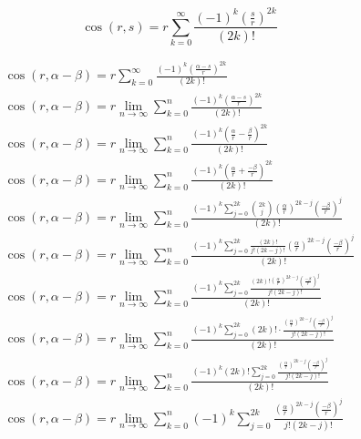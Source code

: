 \documentclass[a4paper,12pt]{report}
\begin{document}
\begin{equation}
\cos(r,s) = r \sum \limits_{k=0}^{\infty} \frac{(-1)^k \left(\frac{s}{r}\right)^{2k}}{(2k)!}
\end{equation}
\begin{landscape}
{
\allowdisplaybreaks
\begin{gather}
\cos(r,\alpha - \beta) = r \sum \limits_{k=0}^{\infty} \frac{(-1)^k \left(\frac{\alpha - s}{r}\right)^{2k}}{(2k)!} \\
\cos(r,\alpha - \beta) = r \lim \limits_{n \to \infty} \sum \limits_{k=0}^{n} \frac{(-1)^k \left(\frac{\alpha - s}{r}\right)^{2k}}{(2k)!} \\
\cos(r,\alpha - \beta) = r \lim \limits_{n \to \infty} \sum \limits_{k=0}^{n} \frac{(-1)^k \left(\frac{\alpha}{r} - \frac{\beta}{r}\right)^{2k}}{(2k)!} \\
\cos(r,\alpha - \beta) = r \lim \limits_{n \to \infty} \sum \limits_{k=0}^{n} \frac{(-1)^k \left(\frac{\alpha}{r} + \frac{-\beta}{r}\right)^{2k}}{(2k)!} \\
\cos(r,\alpha - \beta) = r \lim \limits_{n \to \infty} \sum \limits_{k=0}^{n} \frac{(-1)^k \sum \limits_{j=0}^{2k} \binom{2k}{j} \left(\frac{\alpha}{r}\right)^{2k-j} \left(\frac{-\beta}{r}\right)^j}{(2k)!} \\
\cos(r,\alpha - \beta) = r \lim \limits_{n \to \infty} \sum \limits_{k=0}^{n} \frac{(-1)^k \sum \limits_{j=0}^{2k} \frac{(2k)!}{j! (2k-j)!} \left(\frac{\alpha}{r}\right)^{2k-j} \left(\frac{-\beta}{r}\right)^j}{(2k)!} \\
\cos(r,\alpha - \beta) = r \lim \limits_{n \to \infty} \sum \limits_{k=0}^{n} \frac{(-1)^k \sum \limits_{j=0}^{2k} \frac{(2k)! \left(\frac{\alpha}{r}\right)^{2k-j} \left(\frac{-\beta}{r}\right)^j}{j! (2k-j)!}}{(2k)!} \\
\cos(r,\alpha - \beta) = r \lim \limits_{n \to \infty} \sum \limits_{k=0}^{n} \frac{(-1)^k \sum \limits_{j=0}^{2k} (2k)! \cdot \frac{\left(\frac{\alpha}{r}\right)^{2k-j} \left(\frac{-\beta}{r}\right)^j}{j! (2k-j)!}}{(2k)!} \\
\cos(r,\alpha - \beta) = r \lim \limits_{n \to \infty} \sum \limits_{k=0}^{n} \frac{(-1)^k (2k)! \sum \limits_{j=0}^{2k} \frac{\left(\frac{\alpha}{r}\right)^{2k-j} \left(\frac{-\beta}{r}\right)^j}{j! (2k-j)!}}{(2k)!} \\
\cos(r,\alpha - \beta) = r \lim \limits_{n \to \infty} \sum \limits_{k=0}^{n} (-1)^k \sum \limits_{j=0}^{2k} \frac{\left(\frac{\alpha}{r}\right)^{2k-j} \left(\frac{-\beta}{r}\right)^j}{j! (2k-j)!} \\

\end{gather}}
\end{landscape}
\end{document}
